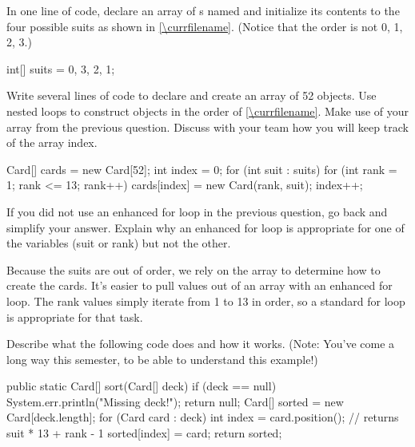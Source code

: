 \begin{javalst}
}
\end{javalst}


\Q In one line of code, declare an array of s named  and initialize its contents to the four possible suits as shown in \ref{\currfilename}.
(Notice that the order is not 0, 1, 2, 3.)


\begin{answer}[2em]
\begin{javaans}
    int[] suits = {0, 3, 2, 1};
\end{javaans}
\end{answer}


\Q \label{build}
Write several lines of code to declare and create an array of 52  objects.
Use nested  loops to construct  objects in the order of \ref{\currfilename}.
Make use of your  array from the previous question.
Discuss with your team how you will keep track of the array index.

\begin{answer}[10em]
\begin{javaans}
Card[] cards = new Card[52];
int index = 0;
for (int suit : suits) {
    for (int rank = 1; rank <= 13; rank++) {
        cards[index] = new Card(rank, suit);
        index++;
    }
}
\end{javaans}
\end{answer}


\Q If you did not use an enhanced for loop in the previous question, go back and simplify your answer.
Explain why an enhanced for loop is appropriate for one of the variables (suit or rank) but not the other.

\begin{answer}[5em]
Because the suits are out of order, we rely on the  array to determine how to create the cards.
It's easier to pull values out of an array with an enhanced for loop.
The rank values simply iterate from 1 to 13 in order, so a standard for loop is appropriate for that task.
\end{answer}


\Q Describe what the following code does and how it works. (Note: You've come a long way this semester, to be able to understand this example!)

\begin{javalst}
public static Card[] sort(Card[] deck) {
    if (deck == null) {
        System.err.println("Missing deck!");
        return null;
    }
    Card[] sorted = new Card[deck.length];
    for (Card card : deck) {
        int index = card.position();       // returns suit * 13 + rank - 1
        sorted[index] = card;
    }
    return sorted;
}
\end{javalst}

